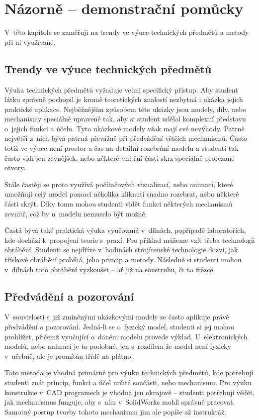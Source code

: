\chapter{Názorně -- demonstrační pomůcky}
V~této kapitole se zaměřuji na trendy ve výuce technických předmětů a metody při ní využívané.

\section{Trendy ve výuce technických předmětů}
Výuka technických předmětů vyžaduje velmi specifický přístup.
Aby student látku správně pochopil je kromě teoretických znalostí nezbytná i ukázka jejich praktické aplikace.
Nejběžnějším způsobem této ukázky jsou modely, díly, nebo mechanismy speciálně upravené tak, aby si student udělal komplexní představu o~jejich funkci a účelu.
Tyto ukázkové modely však mají své nevýhody. 
Patrně největší z~nich bývá patrná převážně při předvádění větších mechanismů.
Často totiž ve výuce není prostor a čas na detailní rozebrání modelu a studenti tak často vidí jen zevnějšek, nebo některé vnitřní části skrz speciálně prořezané otvory.

Stále častěji se proto využívá počítačových vizualizací, nebo animací, které umožňují celý model pomocí několika kliknutí snadno rozebrat, nebo některé části skrýt. 
Díky tomu mohou studenti vidět funkci některých mechanismů zevnitř, což by u~modelu nemuselo být možné.

Častá bývá také praktická výuka vyučovaná v~dílnách, popřípadě laboratořích, kde dochází k~propojení teorie s~praxí.
Pro příklad můžeme vzít třeba technologii obrábění.
Studenti se nejdříve v~hodinách strojírenské technologie dozví, jak třískové obrábění probíhá, jeho princip a metody.
Následně si studenti mohou v~dílnách toto obrábění vyzkoušet -- ať již na soustruhu, či na frézce. 

\section{Předvádění a pozorování}
V~souvislosti s~již zmíněnými ukázkovými modely se často aplikuje právě předvádění a pozorování.
Jedná-li se o~fyzický model, studenti si jej mohou prohlížet, přičemž vyučující o~daném modelu provede výklad.
U~elektronických modelů, nebo animací je to podobné, jen s~rozdílem že model není fyzicky v~učebně, ale je promítán třídě na plátno.

Tato metoda je vhodná primárně pro výuku technických předmětů, kde potřebují studenti znát princip, funkci a účel určité součásti, nebo mechanismu. 
Pro výuku konstrukce v~CAD programech je vhodná jen okrajově -- studenti potřebují vědět, jak mechanismus funguje, aby s~ním v~SolidWorks mohli správně pracovat.
Samotný postup tvorby tohoto mechanismu jim ale popíše až instruktáž.

